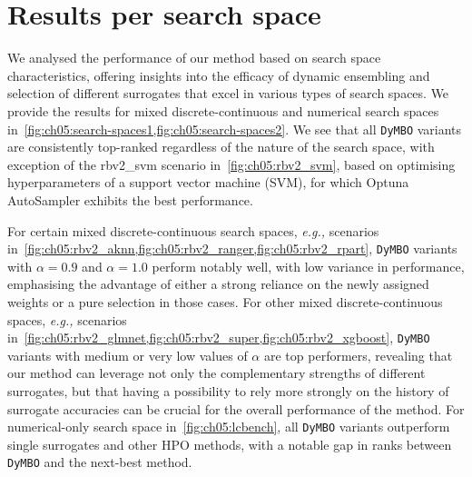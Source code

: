 \section{Results per search space}
\label{sec:ch05:res-search-space}

We analysed the performance of our method based on search space characteristics, offering insights into the efficacy of dynamic ensembling and selection of different surrogates that excel in various types of search spaces.
We provide the results for mixed discrete-continuous and numerical search spaces in~\cref{fig:ch05:search-spaces1,fig:ch05:search-spaces2}.
We see that all \texttt{DyMBO} variants are consistently top-ranked regardless of the nature of the search space, with exception of the rbv2\_svm scenario in~\cref{fig:ch05:rbv2_svm}, based on optimising hyperparameters of a support vector machine (SVM), for which Optuna AutoSampler exhibits the best performance.

For certain mixed discrete-continuous search spaces, \emph{e.g.,} scenarios in~\cref{fig:ch05:rbv2_aknn,fig:ch05:rbv2_ranger,fig:ch05:rbv2_rpart}, \texttt{DyMBO} variants with $\alpha = 0.9$ and $\alpha = 1.0$ perform notably well, with low variance in performance, emphasising the advantage of either a strong reliance on the newly assigned weights or a pure selection in those cases.
For other mixed discrete-continuous spaces, \emph{e.g.,} scenarios in~\cref{fig:ch05:rbv2_glmnet,fig:ch05:rbv2_super,fig:ch05:rbv2_xgboost}, \texttt{DyMBO} variants with medium or very low values of $\alpha$ are top performers, revealing that our method can leverage not only the complementary strengths of different surrogates, but that having a possibility to rely more strongly on the history of surrogate accuracies can be crucial for the overall performance of the method.
For numerical-only search space in~\cref{fig:ch05:lcbench}, all \texttt{DyMBO} variants outperform single surrogates and other HPO methods, with a notable gap in ranks between \texttt{DyMBO} and the next-best method.

